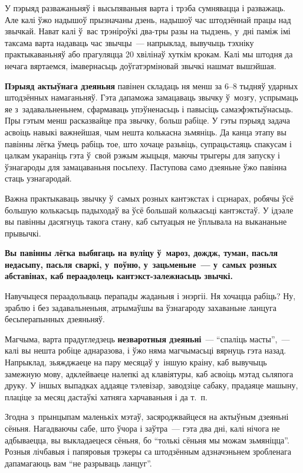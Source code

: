 У пэрыяд разважаньняў і высьпяваньня варта і трэба сумнявацца і разважаць. Але калі ўжо надышоў прызначаны дзень, надышоў час штодзённай працы над звычкай. Нават калі ў~вас трэніроўкі два-тры разы на тыдзень, у~дні паміж імі таксама варта надаваць час звычцы~--- напрыклад, вывучыць тэхніку практыкаваньняў або прагуляцца 20 хвілінаў хуткім крокам. Калі мы штодня да нечага вяртаемся, імавернасьць доўгатэрміновай звычкі нашмат вышэйшая.

\textbf{Пэрыяд актыўнага дзеяньня} павінен складаць ня менш за 6--8 тыдняў ударных штодзённых намаганьняў. Гэта дапаможа замацаваць звычку ў~мозгу, успрымаць яе з~задавальненьнем, сфармаваць упэўненасьць і павысіць самаэфэктыўнасьць. Пры гэтым менш расказвайце пра звычку, больш рабіце. У гэты пэрыяд задача асвоіць навыкі важнейшая, чым нешта колькасна зьмяніць. Да канца этапу вы павінны лёгка ўмець рабіць тое, што хочаце разьвіць, супрацьстаяць спакусам і цалкам укараніць гэта ў~свой рэжым жыцьця, маючы трыгеры для запуску і ўзнагароды для замацаваньня посьпеху. Паступова само дзеяньне ўжо павінна стаць узнагародай.

Важна практыкаваць звычку ў~самых розных кантэкстах і сцэнарах, робячы ўсё большую колькасьць падыходаў ва ўсё большай колькасьці кантэкстаў. У ідэале вы павінны дасягнуць такога стану, каб сытуацыя не ўплывала на выкананьне прывычкі.

\textbf{Вы павінны лёгка выбягаць на вуліцу ў~мароз, дождж, туман, пасьля недасыпу, пасьля сваркі, у~поўню, у~зацьменьне~--- у~самых розных абставінах, каб пераадолець кантэкст-залежнасьць звычкі.}

Навучыцеся пераадольваць перапады жаданьня і энэргіі. Ня хочацца рабіць? Ну, зраблю і без задавальненьня, атрымаўшы ва ўзнагароду захаваньне ланцуга бесьперапынных дзеяньняў.

Магчыма, варта прадугледзець \textbf{незваротныя дзеяньні}~--- ``спаліць масты'',~--- калі вы нешта робіце аднаразова, і ўжо няма магчымасьці вярнуць гэта назад. Напрыклад, зьяжджаеце на пару месяцаў у~іншую краіну, каб вывучыць замежную мову, адклейваеце налепкі ад клавіятуры, каб асвоіць мэтад сьляпога друку. У іншых выпадках аддаяце тэлевізар, заводзіце сабаку, прадаяце машыну, плаціце за месяц дастаўкі хатняга харчаваньня і да т.~п.

Згодна з~прынцыпам маленькіх мэтаў, засяроджвайцеся на актыўным дзеяньні сёньня. Нагадваючы сабе, што ўчора і заўтра~--- гэта два дні, калі нічога не адбываецца, вы выкладаецеся сёньня, бо ``толькі сёньня мы можам зьмяніцца''. Розныя лічбавыя і папяровыя трэкеры са штодзённым адзначэньнем зробленага дапамагаюць вам ``не разрываць ланцуг''.

